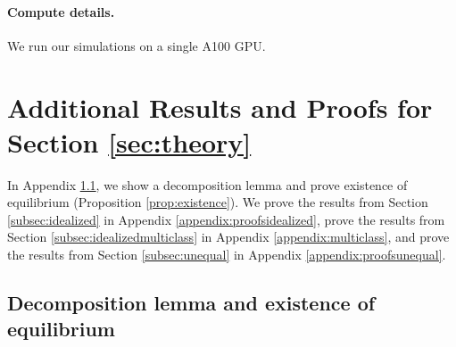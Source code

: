 \documentclass[letterpaper,11pt]{article}
\theoremstyle{plain}
\begin{document}
\paragraph{Compute details.} 
We run our simulations on a single A100 GPU.  


\section{Additional Results and Proofs for Section \ref{sec:theory}}\label{appendix:theory}

In Appendix \ref{subsec:decomposition}, we show a decomposition lemma and prove existence of equilibrium (Proposition \ref{prop:existence}). We prove the results from Section \ref{subsec:idealized} in Appendix \ref{appendix:proofsidealized}, prove the results from Section \ref{subsec:idealizedmulticlass} in Appendix \ref{appendix:multiclass}, and prove the results from Section \ref{subsec:unequal} in Appendix \ref{appendix:proofsunequal}.

\subsection{Decomposition lemma and existence of equilibrium}\label{subsec:decomposition}
\end{document}

